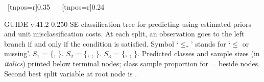 \documentclass{article}
\begin{document}
\begin{landscape}
\begin{center}
{{{{ 
    ~[tnpos=r]{0.35}
    ~{}
   }
   }
    ~[tnpos=r]{0.24}
    ~{}
 }
 }
 \end{center}
GUIDE v.41.2 0.250-SE
classification tree for predicting \texttt{} using
estimated priors
and unit misclassification costs.
At each split, an observation goes to the left branch 
 if and only if the condition is satisfied.
 Symbol `$\leq_*$' stands for `$\leq$ or missing'.
 $S_{1}$ = \{\texttt{}, \texttt{}\}.
 $S_{2}$ = \{\texttt{}, \texttt{},
 \texttt{}\}.
 $S_{3}$ = \{\texttt{}, \texttt{},
 \texttt{}\}.
Predicted classes and sample sizes (in \emph{italics}) printed below terminal nodes;
class sample proportion for \texttt{} =
 \texttt{} beside nodes.
 Second best split variable at root node is \texttt{}.
 \end{landscape}
 
\end{document}
